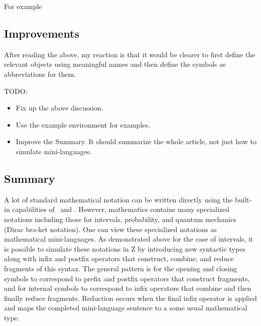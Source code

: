 \documentclass{amsart}
\begin{document}
For example

\begin{zed}
	\zeroR \in \closedLowerBound \zeroR \intersectRightLeft \oneR \openUpperBound
\end{zed}

\subsection{Improvements}

After reading the above, my reaction is that it would be clearer to first define the relevant objects using meaningful names
and then define the symbols as abbreviations for them.

TODO:
\begin{itemize}
\item Fix up the above discussion.
\item Use the example environment for examples.
\item Improve the Summary. It should summarize the whole article, not just how to simulate mini-languages.
\end{itemize}


\subsection{Summary}

A lot of standard mathematical notation can be written directly using the built-in capabilities of \ZN\  and \fuzz.
However, mathematics contains many specialized notations including those for intervals, probability, and quantum mechanics (Dirac bra-ket notation).
One can view these specialized notations as mathematical mini-languages.
As demonstrated above for the case of intervals, it is possible to simulate these notations in Z by introducing new syntactic types along with infix and postfix operators that construct, combine, and reduce fragments of this syntax.
The general pattern is for the opening and closing symbols to correspond to prefix and postfix operators that
construct fragments, and for internal symbols to correspond to infix operators that combine and then finally 
reduce fragments.
Reduction occurs when the final infix operator is applied and maps the completed mini-language sentence to a 
some usual mathematical type.

\printbibliography
\end{document}
